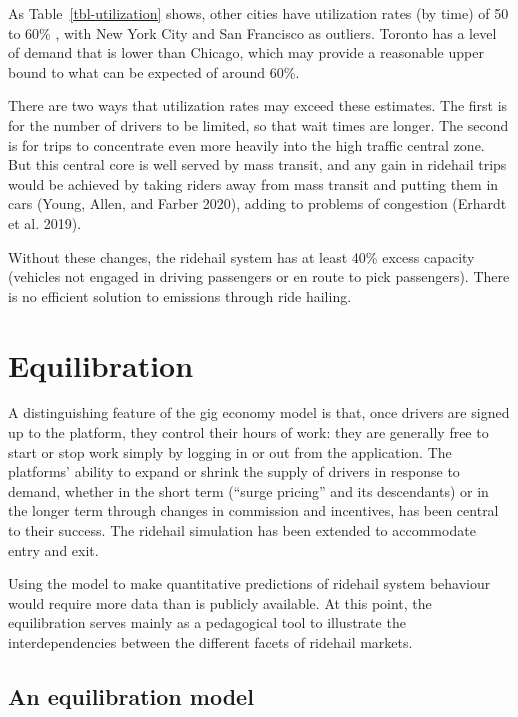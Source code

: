 \documentclass[
  letterpaper,
  DIV=11,
  numbers=noendperiod]{scrartcl}
\begin{document}
As Table~\ref{tbl-utilization} shows, other cities have utilization
rates (by time) of 50 to 60\% , with New York City and San Francisco as
outliers. Toronto has a level of demand that is lower than Chicago,
which may provide a reasonable upper bound to what can be expected of
around 60\%.

There are two ways that utilization rates may exceed these estimates.
The first is for the number of drivers to be limited, so that wait times
are longer. The second is for trips to concentrate even more heavily
into the high traffic central zone. But this central core is well served
by mass transit, and any gain in ridehail trips would be achieved by
taking riders away from mass transit and putting them in cars (Young,
Allen, and Farber 2020), adding to problems of congestion (Erhardt et
al. 2019).

Without these changes, the ridehail system has at least 40\% excess
capacity (vehicles not engaged in driving passengers or en route to pick
passengers). There is no efficient solution to emissions through ride
hailing.

\hypertarget{equilibration}{%
\section{Equilibration}\label{equilibration}}

A distinguishing feature of the gig economy model is that, once drivers
are signed up to the platform, they control their hours of work: they
are generally free to start or stop work simply by logging in or out
from the application. The platforms' ability to expand or shrink the
supply of drivers in response to demand, whether in the short term
(``surge pricing'' and its descendants) or in the longer term through
changes in commission and incentives, has been central to their success.
The ridehail simulation has been extended to accommodate entry and exit.

Using the model to make quantitative predictions of ridehail system
behaviour would require more data than is publicly available. At this
point, the equilibration serves mainly as a pedagogical tool to
illustrate the interdependencies between the different facets of
ridehail markets.

\hypertarget{an-equilibration-model}{%
\subsection{An equilibration model}\label{an-equilibration-model}}
\end{document}
